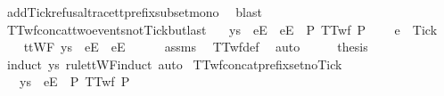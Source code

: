 \ add{\isacharunderscore}Tick{\isacharunderscore}refusal{\isacharunderscore}trace{\isacharunderscore}tt{\isacharunderscore}prefix{\isacharunderscore}subset{\isacharunderscore}mono\ \isamarkupfalse%
\ blast%
\endisatagproof
{\isafoldproof}%
%
\isadelimproof
\isanewline
%
\endisadelimproof
\isanewline
{}\isamarkupfalse%
\ TTwf{\isacharunderscore}concat{\isacharunderscore}two{\isacharunderscore}events{\isacharunderscore}not{\isacharunderscore}Tick{\isacharunderscore}butlast{\isacharcolon}\isanewline
\ \ \ {\isachardoublequoteopen}ys\ {\isacharat}\ {\isacharbrackleft}{\isacharbrackleft}e{}{\isacharbrackright}\isactrlsub E{\isacharbrackright}\ {\isacharat}\ {\isacharbrackleft}{\isacharbrackleft}e{}{\isacharbrackright}\isactrlsub E{\isacharbrackright}\ {\isasymin}\ P{\isachardoublequoteclose}\ {\isachardoublequoteopen}TTwf\ P{\isachardoublequoteclose}\ \isanewline
\ \ \ {\isachardoublequoteopen}e{}\ {\isasymnoteq}\ Tick{\isachardoublequoteclose}\isanewline
%
\isadelimproof
%
\endisadelimproof
%
\isatagproof
{}\isamarkupfalse%
\ {\isacharminus}\isanewline
\ \ \isamarkupfalse%
\ {\isachardoublequoteopen}ttWF\ {\isacharparenleft}ys\ {\isacharat}\ {\isacharbrackleft}{\isacharbrackleft}e{}{\isacharbrackright}\isactrlsub E{\isacharbrackright}\ {\isacharat}\ {\isacharbrackleft}{\isacharbrackleft}e{}{\isacharbrackright}\isactrlsub E{\isacharbrackright}{\isacharparenright}{\isachardoublequoteclose}\isanewline
\ \ \ \ \isamarkupfalse%
\ assms\ \isamarkupfalse%
\ TTwf{\isacharunderscore}def\ \isamarkupfalse%
\ auto\isanewline
\ \ \isamarkupfalse%
\ \isamarkupfalse%
\ {\isacharquery}thesis\isanewline
\ \ \ \ \isamarkupfalse%
\ {\isacharparenleft}induct\ ys\ rule{\isacharcolon}ttWF{\isachardot}induct{\isacharcomma}\ auto{\isacharparenright}\isanewline
{}\isamarkupfalse%
%
\endisatagproof
{\isafoldproof}%
%
\isadelimproof
\isanewline
%
\endisadelimproof
\isanewline
{}\isamarkupfalse%
\ TTwf{\isacharunderscore}concat{\isacharunderscore}prefix{\isacharunderscore}set{\isacharunderscore}no{\isacharunderscore}Tick{\isacharcolon}\isanewline
\ \ \ {\isachardoublequoteopen}ys\ {\isacharat}\ {\isacharbrackleft}{\isacharbrackleft}e{}{\isacharbrackright}\isactrlsub E{\isacharbrackright}\ {\isasymin}\ P{\isachardoublequoteclose}\ {\isachardoublequoteopen}TTwf\ P{\isachardoublequoteclose}\ \isanewline
